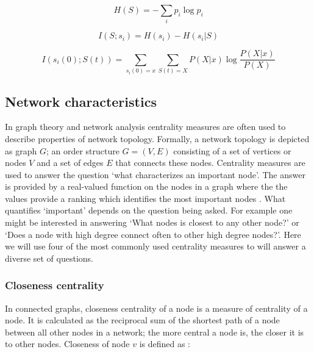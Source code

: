 \documentclass[twoside, twocolumn]{article}
\begin{document}
%



	\begin{equation}
	H(S) = - \sum_i p_i \log p_i
	\label{entropy}
	\end{equation}

	\begin{equation}
	I(S; s_i) = H(s_i) - H(s_i \vert S)
	\end{equation}

	\begin{equation}
	I(s_i(0) ; S(t)) = \sum_{s_i(0)=x}  \sum_{S(t) = X} P(X \vert x) \log \frac{P(X \vert x)}{P(X)}
	\label{eq:mi}
	\end{equation}

	\subsection{Network characteristics}
	In graph theory and network analysis centrality measures are often used to describe properties of network topology. Formally, a network topology is depicted as graph $G$; an order structure $G = (V, E)$ consisting of a set of vertices or nodes $V$ and a set of edges $E$ that connects these nodes. Centrality measures are used to answer the question `what characterizes an important node'. The answer is provided by a real-valued function on the nodes in a graph where the the values provide a ranking which identifies the most important nodes \cite{Borgatti2005, Borgatti2006}.
	What quantifies `important' depends on the question being asked. For example one might be interested in answering `What nodes is closest to any other node?' or `Does a node with high degree connect often to other high degree nodes?'. Here we will use four of the most commonly used centrality measures to will answer a diverse set of questions.

	\subsubsection*{Closeness centrality}
	In connected graphs, closeness centrality of a node is a measure of centrality of a node. It is calculated as the reciprocal sum of the shortest path of a node between all other nodes in a network; the more central a node is, the closer it is to other nodes. Closeness of node $v$ is defined as \cite{Bavalas1950}:
\end{document}
